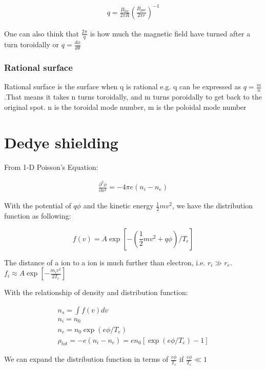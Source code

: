 \begin{eqnarray}
q=\frac{B_{tor}}{2\pi R} (\frac{B_{por}}{2\pi r})^{-1}
\end{eqnarray}

One can also think that $\frac{2\pi}{q}$ is how much the magnetic field have turned after a turn toroidally or $q=\frac{d \phi}{d \theta}$

\subsubsection{Rational surface}

Rational surface is the surface when q is rational e.g. q can be expressed as  $q=\frac{m}{n}$.That means it takes n turns toroidally, and m turns poroidally to get back to the original spot.  n is the toroidal mode number, m is the poloidal mode number




\section{Dedye shielding \label{sec:debye}\cite{Chen}}

From 1-D Poisson's Equation:

\begin{eqnarray}
\frac{\partial^2 \phi}{\partial x^2} =-4\pi e(n_i-n_e)
\end{eqnarray}

With the potential of $q\phi$ and the kinetic energy $\frac{1}{2}mv^2$, we have the distribution function as following:

\begin{equation}
f(v)=A \exp \left[-\left(\frac{1}{2} m v^{2}+q \phi\right) / T_{e}\right]
\end{equation}

The distance of a ion to a ion is much further than electron, i.e. $r_i\gg r_e$. $f_i \approx A\exp[-\frac{m_iv^2}{2T_e}]$

With the relationship of density and distribution function: 

\begin{eqnarray}
 n_s=\int f(v) dv\\
 n_i=n_0\\
 n_e=n_0 \exp (e\phi/T_e)\\
 \rho_{tot}=-e(n_i-n_e)=en_0[\exp (e\phi/T_e)-1]\label{eq:neutral}
\end{eqnarray}


We can expand the distribution function in terms of $\frac{e\phi}{T_e}$ if $\frac{e\phi}{T_e}\ll 1$

